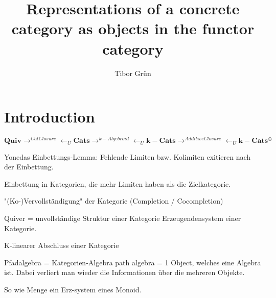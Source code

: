 \documentclass{article}
\title{Representations of a concrete category as objects in the functor category}
\author{Tibor Gr{\"u}n}
\theoremstyle{definition}
\begin{document}

	\maketitle

	\newpage

	\tableofcontents

	\newpage


%

\section{Introduction}

\[
\mathbf{Quiv}\rightarrow^{CatClosure}\leftarrow_{U}\mathbf{Cats}
\rightarrow^{k-Algebroid}\leftarrow_{U}\mathbf{k-Cats}
\rightarrow^{AdditiveClosure}\leftarrow_{U}\mathbf{k-Cats^{\oplus}}
\]








%



%





%

Yonedas Einbettungs-Lemma: Fehlende Limiten bzw. Kolimiten exitieren nach der Einbettung.

Einbettung in Kategorien, die mehr Limiten haben als die Zielkategorie.

"(Ko-)Vervollständigung" der Kategorie (Completion / Cocompletion)

Quiver = unvollständige Struktur einer Kategorie
Erzeugendensystem einer Kategorie.

K-linearer Abschluss einer Kategorie

Pfadalgebra = Kategorien-Algebra
path algebra = 1 Object, welches eine Algebra ist. Dabei verliert man wieder die Informationen über die
mehreren Objekte.

So wie Menge ein Erz-system eines Monoid.
\end{document}
